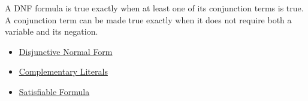 \begin{remark*}[Interpretation]
A DNF formula is true exactly when at least one of its conjunction terms is
true. A conjunction term can be made true exactly when it does not require both
a variable and its negation.
\end{remark*}

\begin{dependencies}
\begin{itemize}
  \item \hyperref[def:disjunctive-normal-form-propositional-logic]{Disjunctive Normal Form}
  \item \hyperref[def:complementary-literals-propositional-logic]{Complementary Literals}
  \item \hyperref[def:satisfiable-formula-propositional-logic]{Satisfiable Formula}
\end{itemize}
\end{dependencies}
